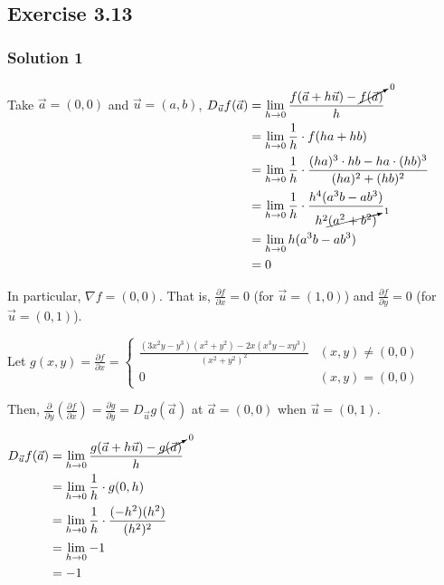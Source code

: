 \documentclass[11pt,fleqn]{book} %
\begin{document}
{~~~}

\subsection*{Exercise 3.13}

\subsubsection*{Solution 1}

Take $\vec{a} = (0,0)$ and $\vec{u} = (a,b)$, 
$\begin{aligned}[t]
    D_{\vec{u}} f(\vec{a}) & = \lim_{h\to0} \frac{ f(\vec{a} + h\vec{u}) - \cancelto{0}{{f(\vec{a})}}}{h}               \\
                           & = \lim_{h\to0} \frac{1}{h} \cdot f(ha + hb)                                                \\
                           & = \lim_{h\to0} \frac{1}{h} \cdot \frac{(ha)^3 \cdot hb - ha \cdot (hb)^3}{(ha)^2 + (hb)^2} \\
                           & = \lim_{h\to0} \frac{1}{h} \cdot \frac{h^4(a^3b - ab^3)}{h^2\cancelto{1}{(a^2+b^2)}}       \\
                           & = \lim_{h\to0} h(a^3b - ab^3)                                                              \\
                           & = 0
\end{aligned}$

In particular, $\nabla f = (0,0)$. That is, $\frac{\partial f}{\partial x} = 0$ (for $\vec{u} = (1,0)$) and $\frac{\partial f}{\partial y} = 0$ (for $\vec{u} = (0,1)$).

Let $g(x,y) = \frac{\partial f}{\partial x} =
    \begin{cases}
        \frac{(3x^2y - y^3)(x^2 + y^2) - 2x(x^3y - xy^3)}{(x^2 + y^2)^2} & (x,y) \neq (0,0) \\
        0                                                                & (x,y) = (0,0)
    \end{cases}$

Then, $\frac{\partial}{\partial y}\left( \frac{\partial f}{\partial x} \right) = \frac{\partial g}{\partial y} = D_{\vec{u}} g(\vec{a})$ at $\vec{a} = (0,0)$ when $\vec{u} = (0,1)$. 

$\begin{aligned}[t]
    D_{\vec{u}} f(\vec{a}) & = \lim_{h\to0} \frac{g(\vec{a} + h\vec{u}) - \cancelto{0}{g(\vec{a})}}{h} \\
                           & = \lim_{h\to0} \frac{1}{h} \cdot g(0,h)                                   \\
                           & = \lim_{h\to0} \frac{1}{h} \cdot \frac{(-h^2)(h^2)}{(h^2)^2}              \\
                           & = \lim_{h\to0} -1                                                         \\
                           & = -1
\end{aligned}$
\end{document}
